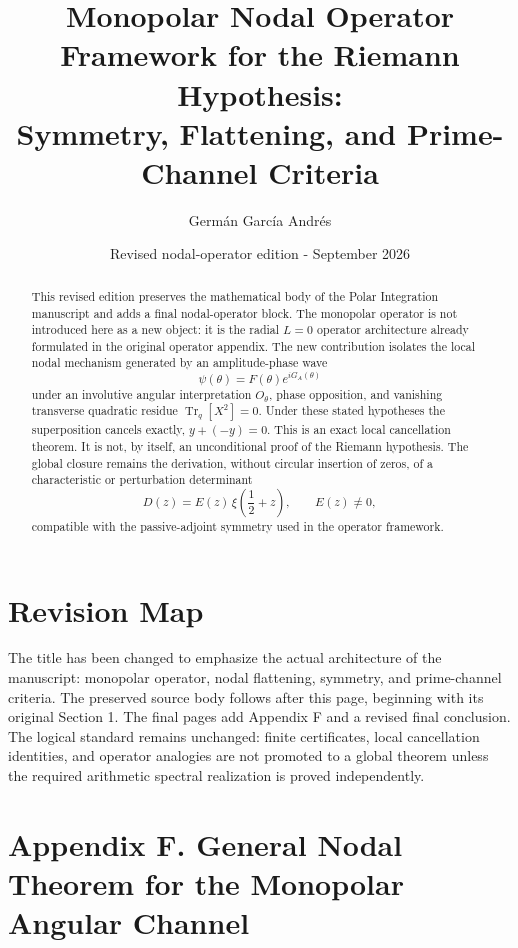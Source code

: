 \documentclass[11pt,letterpaper]{amsart}
\title[Monopolar Nodal Operator Framework]{Monopolar Nodal Operator Framework for the Riemann Hypothesis:\\
Symmetry, Flattening, and Prime-Channel Criteria}
\author{Germ\'an Garc\'ia Andr\'es}
\date{Revised nodal-operator edition - September 2026}
\theoremstyle{definition}
\begin{document}
\maketitle

\begin{abstract}
This revised edition preserves the mathematical body of the Polar Integration manuscript and
adds a final nodal-operator block. The monopolar operator is not introduced here as a new
object: it is the radial \(L=0\) operator architecture already formulated in the original
operator appendix. The new contribution isolates the local nodal mechanism generated by an
amplitude-phase wave
\[
  \psi(\theta)=F(\theta)e^{iG_A(\theta)}
\]
under an involutive angular interpretation \(O_\theta\), phase opposition, and vanishing
transverse quadratic residue \(\operatorname{Tr}_q[X^2]=0\). Under these stated hypotheses the
superposition cancels exactly, \(y+(-y)=0\). This is an exact local cancellation theorem. It is
not, by itself, an unconditional proof of the Riemann hypothesis. The global closure remains
the derivation, without circular insertion of zeros, of a characteristic or perturbation
determinant
\[
  D(z)=E(z)\,\xi\!\left(\frac12+z\right),\qquad E(z)\neq 0,
\]
compatible with the passive-adjoint symmetry used in the operator framework.
\end{abstract}

\section*{Revision Map}

The title has been changed to emphasize the actual architecture of the manuscript:
monopolar operator, nodal flattening, symmetry, and prime-channel criteria. The preserved
source body follows after this page, beginning with its original Section 1. The final pages add
Appendix F and a revised final conclusion. The logical standard remains unchanged: finite
certificates, local cancellation identities, and operator analogies are not promoted to a
global theorem unless the required arithmetic spectral realization is proved independently.

\clearpage



\clearpage
\appendix
\section*{Appendix F. General Nodal Theorem for the Monopolar Angular Channel}
\end{document}
